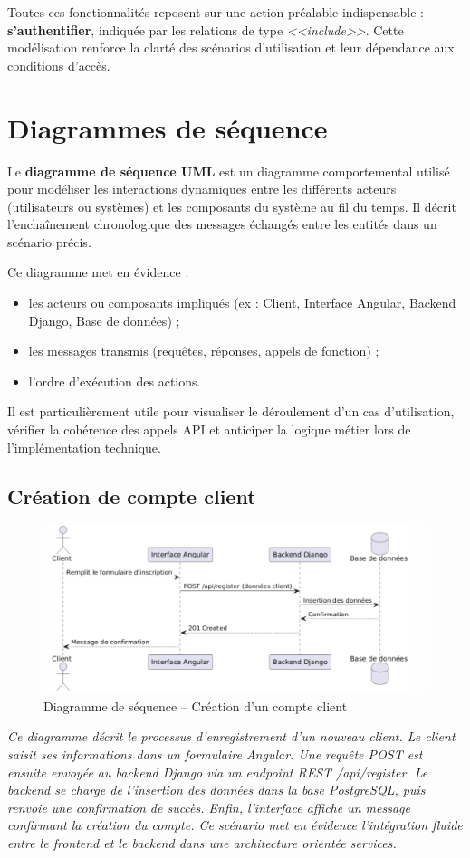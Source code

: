 Toutes ces fonctionnalités reposent sur une action préalable indispensable : \textbf{s’authentifier}, indiquée par les relations de type \textit{<<include>>}. Cette modélisation renforce la clarté des scénarios d’utilisation et leur dépendance aux conditions d’accès.

\section{Diagrammes de séquence}
Le \textbf{diagramme de séquence UML} est un diagramme comportemental utilisé pour modéliser les interactions dynamiques entre les différents acteurs (utilisateurs ou systèmes) et les composants du système au fil du temps. Il décrit l'enchaînement chronologique des messages échangés entre les entités dans un scénario précis.

Ce diagramme met en évidence :
\begin{itemize}
    \item les acteurs ou composants impliqués (ex : Client, Interface Angular, Backend Django, Base de données) ;
    \item les messages transmis (requêtes, réponses, appels de fonction) ;
    \item l’ordre d’exécution des actions.
\end{itemize}

Il est particulièrement utile pour visualiser le déroulement d’un cas d’utilisation, vérifier la cohérence des appels API et anticiper la logique métier lors de l’implémentation technique.
\subsection*{Création de compte client}
\begin{figure}[H]
\centering
\includegraphics[width=0.85\linewidth]{figures/Séquence – Création de compte client.png}
\caption{Diagramme de séquence – Création d’un compte client}
\end{figure}
\textit{Ce diagramme décrit le processus d’enregistrement d’un nouveau client. Le client saisit ses informations dans un formulaire Angular. Une requête POST est ensuite envoyée au backend Django via un endpoint REST /api/register. Le backend se charge de l’insertion des données dans la base PostgreSQL, puis renvoie une confirmation de succès. Enfin, l’interface affiche un message confirmant la création du compte. Ce scénario met en évidence l’intégration fluide entre le frontend et le backend dans une architecture orientée services.}

